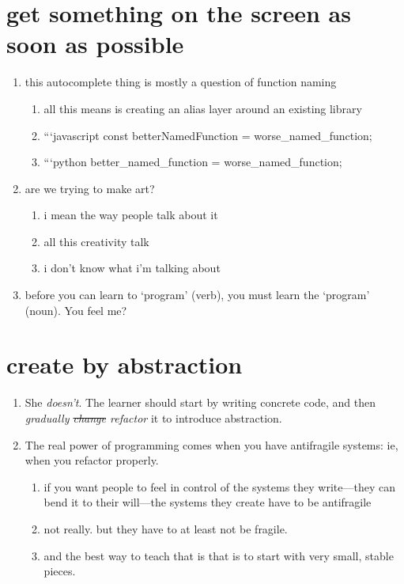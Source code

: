 \section{get something on the screen as soon as possible}
\begin{enumerate}
	\item this autocomplete thing is mostly a question of function naming
	\begin{enumerate}
		\item all this means is creating an alias layer around an existing library
		\item ```javascript const betterNamedFunction = worse\_named\_function;
		\item ```python better\_named\_function = worse\_named\_function;
	\end{enumerate}
	\item are we trying to make art?
	\begin{enumerate}
		\item i mean the way people talk about it
		\item all this creativity talk
		\item i don't know what i'm talking about
	\end{enumerate}
	\item before you can learn to `program' (verb), you must learn the `program' (noun). You feel me?
\end{enumerate}
\section{create by abstraction}
\begin{enumerate}
	\item She \emph{doesn't}. The learner should start by writing concrete code, and then \emph{gradually \sout{change} refactor} it to introduce abstraction.
	\item The real power of programming comes when you have antifragile systems: ie, when you refactor properly.
	\begin{enumerate}
		\item if you want people to feel in control of the systems they write---they can bend it to their will---the systems they create have to be antifragile
		\item not really. but they have to at least not be fragile.
		\item and the best way to teach that is that is to start with very small, stable pieces.
	\end{enumerate}
\end{enumerate}

